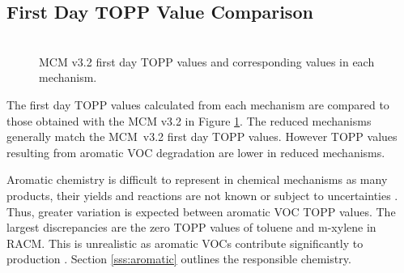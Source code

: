 \subsection{First Day TOPP Value Comparison} \label{ss:day1} %

\begin{figure}
    \centering
    \includegraphics[width=\textwidth]{img/first_day_values}
    \vspace{1mm}
    \caption{MCM v3.2 first day TOPP values and corresponding values in each mechanism.}
    \vspace{-4mm}
    \label{f:first_day}
\end{figure}

The first day TOPP values calculated from each mechanism are compared to those obtained with the MCM v3.{2} in Figure \ref{f:first_day}. 
The reduced mechanisms generally match the \mbox{MCM v3.2} first day TOPP values. 
However TOPP values resulting from aromatic VOC degradation are lower in reduced mechanisms.

Aromatic chemistry is difficult to represent in chemical mechanisms as many products, their yields and reactions are not known or subject to uncertainties \citep{Vereecken:2012}. 
Thus, greater variation is expected between aromatic VOC TOPP values.
The largest discrepancies are the zero TOPP values of toluene and m-xylene in RACM. 
This is unrealistic as aromatic VOCs contribute significantly to  production \citep{Derwent:1998}. 
Section \ref{sss:aromatic} outlines the responsible chemistry.

